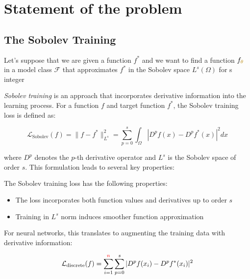 \documentclass[a4paper]{article}
\theoremstyle{plain}
\theoremstyle{definition}
\theoremstyle{remark}
\begin{document}
\newpage












\section{Statement of the problem}

\subsection{The Sobolev Training}

Let's suppose that we are given a function $f^*$ and we want to find a function $f_{\textcolor{darkyellow}{\theta}}$ in a model class $\mathcal{F}$ that approximates $f^*$ in the Sobolev space $L^s(\Omega)$ for s integer

\textit{Sobolev training}
is an approach that incorporates derivative information into the learning process. 
For a function $f$ and target function $f^*$, the Sobolev training loss is defined as:

\begin{tcolorbox}[colback=sobolevcolor!5,colframe=sobolevcolor!60!black,title=Sobolev Training Loss]
\begin{equation}
\label{eq:sobolev_loss}
\mathcal{L}_{\text{Sobolev}}(f) = \|f - f^*\|_{L^s}^2 = \sum_{p=0}^s \int_{\Omega} |D^p f(x) - D^p f^*(x)|^2 dx
\end{equation}
\end{tcolorbox}

where $D^p$ denotes the $p$-th derivative operator and $L^s$ is the Sobolev space of order $s$. This formulation leads to several key properties:

The Sobolev training loss has the following properties:
\begin{itemize}
    \item The loss incorporates both function values and derivatives up to order $s$
    \item Training in $L^s$ norm induces smoother function approximation
\end{itemize}

For neural networks, this translates to augmenting the training data with derivative information:

$$\mathcal{L}_{\text{discrete}}(f) = \sum_{i=1}^{\textcolor{red}{n}} \sum_{p=0}^s |D^p f(x_i) - D^p f^*(x_i)|^2$$
\end{document}
